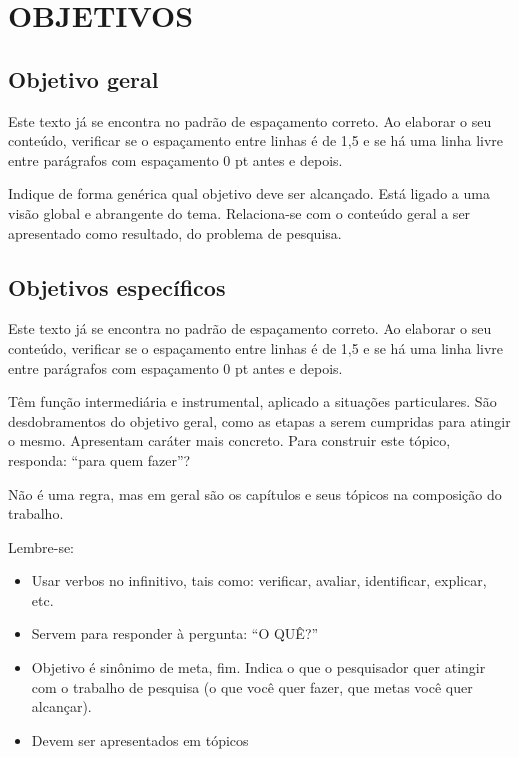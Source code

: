 \section{OBJETIVOS}
\subsection{Objetivo geral}

Este texto já se encontra no padrão de espaçamento correto. Ao elaborar o seu conteúdo, verificar se o espaçamento entre linhas é de 1,5 e se há uma linha livre entre parágrafos com espaçamento 0 pt antes e depois. 

Indique de forma genérica qual objetivo deve ser alcançado. Está ligado a uma visão global e abrangente do tema. Relaciona-se com o conteúdo geral a ser apresentado como resultado, do problema de pesquisa.   

\subsection{Objetivos específicos}

Este texto já se encontra no padrão de espaçamento correto. Ao elaborar o seu conteúdo, verificar se o espaçamento entre linhas é de 1,5 e se há uma linha livre entre parágrafos com espaçamento 0 pt antes e depois. 

Têm função intermediária e instrumental, aplicado a situações particulares. São desdobramentos do objetivo geral, como as etapas a serem cumpridas para atingir o mesmo. Apresentam caráter mais concreto. Para construir este tópico, responda: “para quem fazer”? 

Não é uma regra, mas em geral são os capítulos e seus tópicos na composição do trabalho. 

Lembre-se:  
\begin{itemize}

 \item Usar verbos no infinitivo, tais como: verificar, avaliar, identificar, explicar, etc. 

 \item Servem para responder à pergunta: “O QUÊ?” 

 \item Objetivo é sinônimo de meta, fim. Indica o que o pesquisador quer atingir com o trabalho de pesquisa (o que você quer fazer, que metas você quer alcançar).  

 \item Devem ser apresentados em tópicos 
\end{itemize}

\cite{dicionario}
